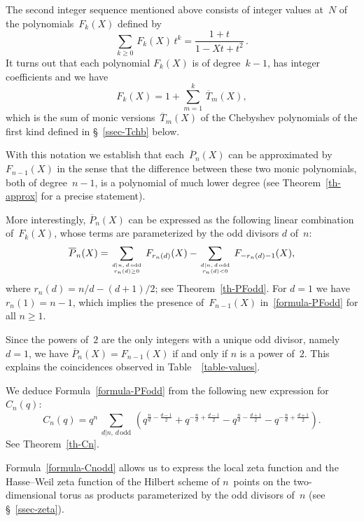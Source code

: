 \documentclass[11pt, a4paper]{amsart}
\theoremstyle{definition}
\newcommand\Pg{\overline{P}}
\newcommand\TT{\overline{T}}
\numberwithin{equation}{section}
\begin{document}
The second integer sequence mentioned above consists of integer values at~$N$ of the polynomials~$F_k(X)$ 
defined by
\begin{equation}\label{gf-F}
\sum_{k\geq 0} \, F_k(X) \, t^k 
= \frac{1+t}{1 - Xt + t^2} \, .
\end{equation}
It turns out that each polynomial $F_k(X)$ is of degree~$k-1$, has integer coefficients and we have
\begin{equation}\label{eq-FFTT}
F_k(X) = 1 + \sum_{m=1}^{k} \, \TT_m(X) ,
\end{equation}
which is the sum of monic versions~$\TT_m(X)$ of the Chebyshev polynomials of the first kind
defined in \S~\ref{ssec-Tchb} below.

With this notation we establish that each~$\Pg_n(X)$ can be approximated by~$F_{n-1}(X)$ in the sense that 
the difference between these two monic  polynomials, both of degree~$n-1$,
is a polynomial of much lower degree (see Theorem~\ref{th-approx} for a precise statement). 

More interestingly, $\Pg_n(X)$ can be expressed as the following linear combination of~$F_k(X)$,
whose terms are parameterized by the odd divisors $d$ of~$n$:
\begin{equation}\label{formula-PFodd}
\Pg_n(X) = \sum_{d | n, \, d \, \mathrm{odd} \atop r_n(d) \geq 0} \, F_{r_n(d)}(X) 
- \sum_{d | n, \, d \, \mathrm{odd} \atop r_n(d) <0} \, F_{-r_n(d) -1}(X) ,
\end{equation}
where $r_n(d) = {n/d} - {(d+1)/2}$; see Theorem~\ref{th-PFodd}.
For $d=1$ we have $r_n(1) = n-1$, which implies the presence of~$F_{n-1}(X)$ in~\eqref{formula-PFodd} for all $n\geq 1$.

Since the powers of~$2$ are the only integers with a unique odd divisor, namely $d=1$, 
we have $\Pg_n(X) = F_{n-1}(X)$ if and only if $n$ is a power of~$2$.
This explains the coincidences observed in Table~~\ref{table-values}.

We deduce Formula~\eqref{formula-PFodd} from the following new expression for~$C_n(q)$:
\begin{equation}\label{formula-Cnodd}
C_n(q) = q^n \, \sum_{d | n , \, d \, \mathrm{odd}} \, 
\left( q^{\frac{n}{d} - \frac{d-1}{2}} +  q^{-\frac{n}{d} + \frac{d-1}{2}}  
- q^{\frac{n}{d} - \frac{d+1}{2}}  - q^{-\frac{n}{d} + \frac{d+1}{2}} \right) .
\end{equation}
See Theorem~\ref{th-Cn}.

Formula~\eqref{formula-Cnodd} allows us to express the local zeta function and the Hasse--Weil zeta function
of the Hilbert scheme of $n$~points on the two-dimensional torus
as products parameterized by the odd divisors of~$n$ (see \S~\ref{ssec-zeta}).
\end{document}
